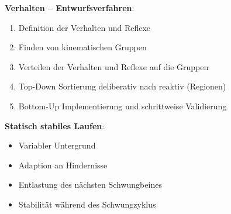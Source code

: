 \textbf{Verhalten -- Entwurfsverfahren}:
\begin{enumerate}
	\item Definition der Verhalten und Reflexe
	\item Finden von kinematischen Gruppen
	\item Verteilen der Verhalten und Reflexe auf die Gruppen
	\item Top-Down Sortierung deliberativ nach reaktiv (Regionen)
	\item Bottom-Up Implementierung und schrittweise Validierung
\end{enumerate}
\newpage
\textbf{Statisch stabiles Laufen}:
\begin{itemize}
	\item Variabler Untergrund
	\item Adaption an Hindernisse
	\item Entlastung des nächsten Schwungbeines
	\item Stabilität während des Schwungzyklus
\end{itemize}

